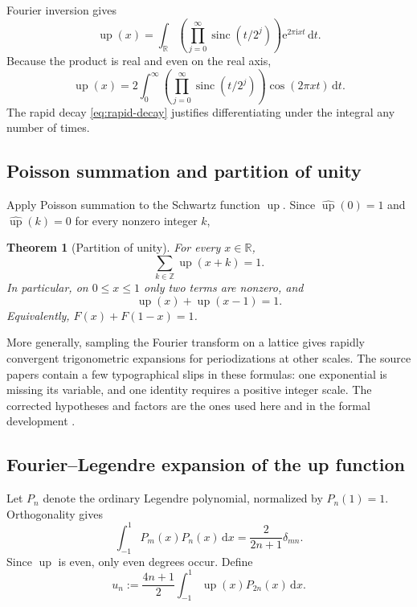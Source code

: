 \documentclass[11pt]{article}
\numberwithin{equation}{section}
\newtheorem{theorem}{Theorem}[section]
\theoremstyle{definition}
\theoremstyle{remark}
\newcommand{\R}{\mathbb R}
\newcommand{\Z}{\mathbb Z}
\newcommand{\upf}{\operatorname{up}}
\newcommand{\sinc}{\operatorname{sinc}}
\newcommand{\dd}{\,\mathrm d}
\newcommand{\e}{\mathrm e}
\newcommand{\ii}{\mathrm i}
\begin{document}
Fourier inversion gives
\begin{equation}\label{eq:up-inversion}
 \upf(x)=\int_{\R}\left(\prod_{j=0}^{\infty}\sinc(t/2^j)\right)
                    \e^{2\pi\ii xt}\dd t.
\end{equation}
Because the product is real and even on the real axis,
\begin{equation}\label{eq:up-cosine-integral}
 \upf(x)=2\int_0^\infty\left(\prod_{j=0}^{\infty}\sinc(t/2^j)\right)
                    \cos(2\pi xt)\dd t.
\end{equation}
The rapid decay \eqref{eq:rapid-decay} justifies differentiating under the integral any number of times.

\subsection{Poisson summation and partition of unity}

Apply Poisson summation to the Schwartz function $\upf$.  Since $\widehat{\upf}(0)=1$ and $\widehat{\upf}(k)=0$ for every nonzero integer $k$,
\begin{theorem}[Partition of unity]\label{thm:partition-unity}
For every $x\in\R$,
\begin{equation}\label{eq:partition-unity}
 \sum_{k\in\Z}\upf(x+k)=1.
\end{equation}
In particular, on $0\le x\le1$ only two terms are nonzero, and
\begin{equation}\label{eq:two-term-partition}
 \upf(x)+\upf(x-1)=1.
\end{equation}
Equivalently, $F(x)+F(1-x)=1$.
\end{theorem}

More generally, sampling the Fourier transform on a lattice gives rapidly convergent trigonometric expansions for periodizations at other scales.  The source papers contain a few typographical slips in these formulas: one exponential is missing its variable, and one identity requires a positive integer scale.  The corrected hypotheses and factors are the ones used here and in the formal development \cite{ProveIt}.

\subsection{Fourier--Legendre expansion of the up function}

Let $P_n$ denote the ordinary Legendre polynomial, normalized by $P_n(1)=1$.  Orthogonality gives
\begin{equation}\label{eq:Legendre-orthogonality}
 \int_{-1}^{1}P_m(x)P_n(x)\dd x=\frac{2}{2n+1}\delta_{mn}.
\end{equation}
Since $\upf$ is even, only even degrees occur.  Define
\begin{equation}\label{eq:Legendre-coeff-def}
 u_n:=\frac{4n+1}{2}\int_{-1}^{1}\upf(x)P_{2n}(x)\dd x.
\end{equation}
\end{document}
